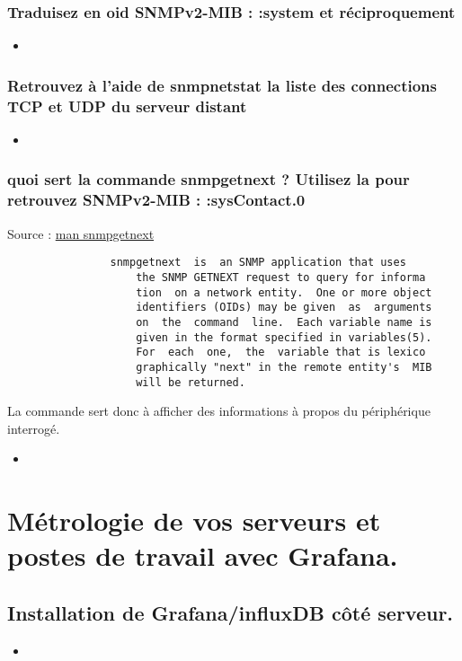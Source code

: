 \documentclass[10pt,a4paper]{article}
\newcommand{\insertcode}[2]{\begin{itemize}\item[]\end{itemize}}
\begin{document}
\subsubsection{Traduisez en oid SNMPv2-MIB : :system et réciproquement}
\insertcode{commande/7.txt}{Traduction}

\subsubsection{Retrouvez à l’aide de snmpnetstat la liste des connections TCP et UDP du serveur distant}
\insertcode{commande/8.txt}{snmpNetstat}


\subsubsection{ quoi sert la commande snmpgetnext ? Utilisez la pour retrouvez SNMPv2-MIB : :sysContact.0}
Source : \url{man snmpgetnext}
\begin{lstlisting}
                snmpgetnext  is  an SNMP application that uses
                    the SNMP GETNEXT request to query for informa
                    tion  on a network entity.  One or more object
                    identifiers (OIDs) may be given  as  arguments
                    on  the  command  line.  Each variable name is
                    given in the format specified in variables(5).
                    For  each  one,  the  variable that is lexico
                    graphically "next" in the remote entity's  MIB
                    will be returned.

\end{lstlisting}
La commande sert donc à afficher des informations à propos du périphérique interrogé.
\insertcode{commande/9.txt}{snmpgetnext}


\section{Métrologie de vos serveurs et postes de travail avec Grafana.}
\subsection{Installation de Grafana/influxDB côté serveur.}
\insertcode{commande/10.txt}{Installation/Utilisation de Docker}
\end{document}
